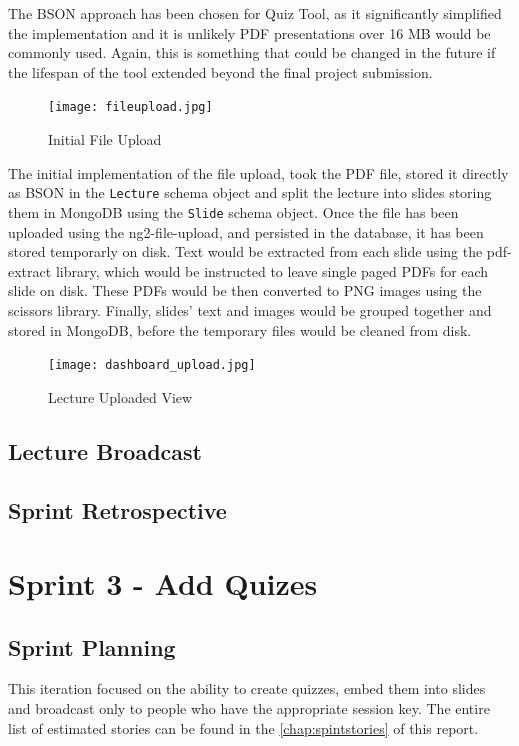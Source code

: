 The BSON approach has been chosen for Quiz Tool, as it significantly simplified the implementation and it is
unlikely PDF presentations over 16 MB would be commonly used. Again, this is something that could be changed
in the future if the lifespan of the tool extended beyond the final project submission.

\begin{figure}[h!]
    \centering
    \texttt{[image: fileupload.jpg]}
    \caption{Initial File Upload}
    \label{fig:initialfileupload}
\end{figure}

The initial implementation of the file upload, took the PDF file, stored it directly as BSON in the
\texttt{Lecture} schema object and split the lecture into slides storing them in MongoDB using
the \texttt{Slide} schema object. Once the file has been uploaded using the ng2-file-upload\cite{51},
and persisted in the database, it has been stored temporarly on disk. Text would be extracted from
each slide using the pdf-extract\cite{52} library, which would be instructed to leave single paged
PDFs for each slide on disk. These PDFs would be then converted to PNG images using the scissors\cite{53}
library. Finally, slides' text and images would be grouped together and stored in MongoDB, before the
temporary files would be cleaned from disk.

\begin{figure}[ht]
    \centering
    \texttt{[image: dashboard\_upload.jpg]}
    \caption{Lecture Uploaded View}
    \label{fig:dashboarduploaded}
\end{figure}

\subsection{Lecture Broadcast}


\subsection{Sprint Retrospective}


\section{Sprint 3 - Add Quizes}
\subsection{Sprint Planning}
This iteration focused on the ability to create quizzes, embed them into slides and
broadcast only to people who have the appropriate session key. The entire list of estimated stories
can be found in the \autoref{chap:spintstories} of this report.

